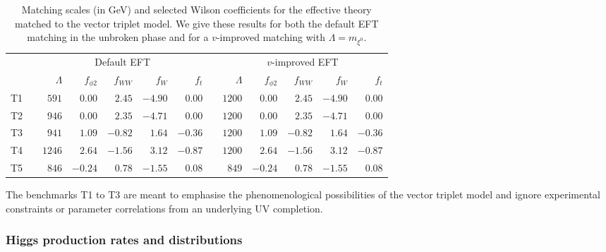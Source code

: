 \begin{table}
  \begin{tabular}{c c rrrrr c rrrrr}
    \toprule
    \multirow{2}{*}{} && \multicolumn{5}{c}{Default EFT}
    && \multicolumn{5}{c}{$v$-improved EFT} \\
    \cmidrule{3-7} \cmidrule{9-13}
    && $\Lambda$ & $f_{\phi 2}$ & $f_{WW}$ & $f_W$ & $f_{t}$
    && $\Lambda$ & $f_{\phi 2}$ & $f_{WW}$ & $f_W$ & $f_{t}$\\
    \midrule
    T1 && $591$ & $0.00$ & $2.45$ & $-4.90$ & $0.00$ 
        && $1200$ & $0.00$ & $2.45$ & $-4.90$ & $0.00$ \\
    T2 && $946$ & $0.00$ & $2.35$ & $-4.71$ & $0.00$
         && $1200$ & $0.00$ & $2.35$ & $-4.71$ & $0.00$ \\
    T3 && $941$ & $1.09$ & $-0.82$ & $1.64$ & $-0.36$ 
         && $1200$ & $1.09$ & $-0.82$ & $1.64$ & $-0.36$  \\
    T4 && $1246$ & $2.64$ & $-1.56$ & $3.12$ & $-0.87$
         && $1200$ & $2.64$ & $-1.56$ & $3.12$ & $-0.87$ \\
    T5 && $846$ & $-0.24$ & $0.78$ & $-1.55$ & $0.08$ 
         && $849$ & $-0.24$ & $0.78$ & $-1.55$ & $0.08$ \\
    \bottomrule
    \end{tabular}
    \caption[EFT description for the vector triplet benchmarks]{Matching
      scales (in GeV) and selected Wilson coefficients for the effective
      theory matched to the vector triplet model. We give these results 
      for both the default EFT matching in the unbroken phase and for a
      $v$-improved matching with $\Lambda = m_{\xi^0}$.}
  \label{tbl:validity_vector_triplet_eft}
\end{table}

The benchmarks T1 to T3 are meant to emphasise the phenomenological
possibilities of the vector triplet model and ignore experimental
constraints or parameter correlations from an underlying UV
completion.



\subsubsection{Higgs production rates and distributions}


